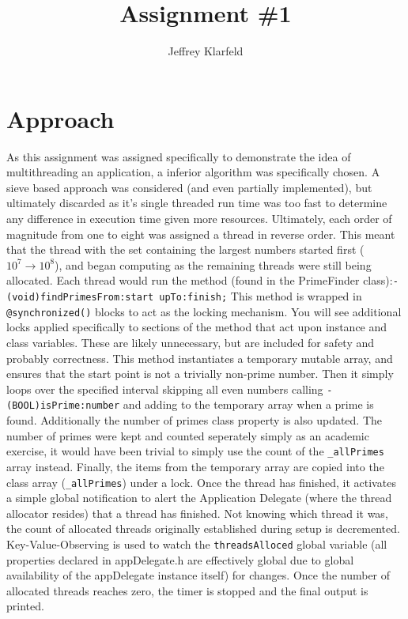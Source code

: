 \documentclass[12pt]{article}
\title{Assignment \#1}
\author{Jeffrey Klarfeld}
\begin{document}
\maketitle

\section{Approach}
As this assignment was assigned specifically to demonstrate the idea of multithreading an application, a inferior algorithm was specifically chosen.  A sieve based approach was considered (and even partially implemented), but ultimately discarded as it's single threaded run time was too fast to determine any difference in execution time given more resources.
\newline\newline
Ultimately, each order of magnitude from one to eight was assigned a thread in reverse order.  This meant that the thread with the set containing the largest numbers started first ($10^7 \rightarrow 10^8$), and began computing as the remaining threads were still being allocated.
\newline\newline
Each thread would run the method (found in the PrimeFinder class):\newline\newline\texttt{- (void)findPrimesFrom:start upTo:finish;} \newline\newline This method is wrapped in \texttt{@synchronized()} blocks to act as the locking mechanism.  You will see additional locks applied specifically to sections of the method that act upon instance and class variables. These are likely unnecessary, but are included for safety and probably correctness. This method instantiates a temporary mutable array, and ensures that the start point is not a trivially non-prime number.  Then it simply loops over the specified interval skipping all even numbers calling \texttt{- (BOOL)isPrime:number} and adding to the temporary array when a prime is found.  Additionally the number of primes class property is also updated.  The number of primes were kept and counted seperately simply as an academic exercise, it would have been trivial to simply use the count of the \texttt{\_allPrimes} array instead.  Finally, the items from the temporary array are copied into the class array (\texttt{\_allPrimes}) under a lock. 
\newline\newline
Once the thread has finished, it activates a simple global notification to alert the Application Delegate (where the thread allocator resides) that a thread has finished.  Not knowing which thread it was, the count of allocated threads originally established during setup is decremented.  Key-Value-Observing is used to watch the \texttt{threadsAlloced} global variable (all properties declared in appDelegate.h are effectively global due to global availability of the appDelegate instance itself) for changes.  Once the number of allocated threads reaches zero, the timer is stopped and the final output is printed.    
\end{document}
